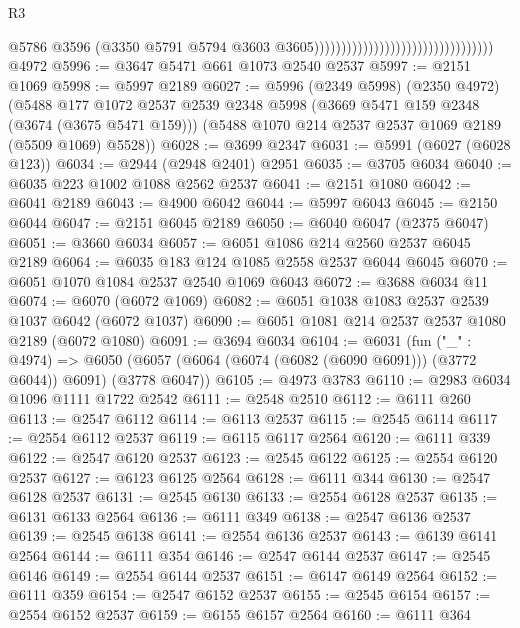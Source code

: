 \begin{lexlean}{R3}
\begin{coremodule}
                                                                    @5786
                                                                    @3596
                                                                    (@3350
                                                                      @5791
                                                                      @5794
                                                                      @3603
                                                                      @3605)))))))))))))))))))))))))))))))))
    @4972
@5996 := @3647 @5471 @661 @1073 @2540 @2537
@5997 := @2151 @1069
@5998 := @5997 @2189
@6027 := @5996
    (@2349 @5998)
    (@2350 @4972)
    (@5488
      @177
      @1072
      @2537
      @2539
      @2348
      @5998
      (@3669 @5471 @159 @2348 (@3674 (@3675 @5471 @159)))
      (@5488 @1070 @214 @2537 @2537 @1069 @2189 (@5509 @1069) @5528))
@6028 := @3699 @2347
@6031 := @5991 (@6027 (@6028 @123))
@6034 := @2944 (@2948 @2401) @2951
@6035 := @3705 @6034
@6040 := @6035 @223 @1002 @1088 @2562 @2537
@6041 := @2151 @1080
@6042 := @6041 @2189
@6043 := @4900 @6042
@6044 := @5997 @6043
@6045 := @2150 @6044
@6047 := @2151 @6045 @2189
@6050 := @6040 @6047 (@2375 @6047)
@6051 := @3660 @6034
@6057 := @6051 @1086 @214 @2560 @2537 @6045 @2189
@6064 := @6035 @183 @124 @1085 @2558 @2537 @6044 @6045
@6070 := @6051 @1070 @1084 @2537 @2540 @1069 @6043
@6072 := @3688 @6034 @11
@6074 := @6070 (@6072 @1069)
@6082 := @6051 @1038 @1083 @2537 @2539 @1037 @6042 (@6072 @1037)
@6090 := @6051 @1081 @214 @2537 @2537 @1080 @2189 (@6072 @1080)
@6091 := @3694 @6034
@6104 := @6031
    (fun ("_" : @4974) =>
    @6050 (@6057 (@6064 (@6074 (@6082 (@6090 @6091))) (@3772 @6044)) @6091) (@3778 @6047))
@6105 := @4973 @3783
@6110 := @2983 @6034 @1096 @1111 @1722 @2542
@6111 := @2548 @2510
@6112 := @6111 @260
@6113 := @2547 @6112
@6114 := @6113 @2537
@6115 := @2545 @6114
@6117 := @2554 @6112 @2537
@6119 := @6115 @6117 @2564
@6120 := @6111 @339
@6122 := @2547 @6120 @2537
@6123 := @2545 @6122
@6125 := @2554 @6120 @2537
@6127 := @6123 @6125 @2564
@6128 := @6111 @344
@6130 := @2547 @6128 @2537
@6131 := @2545 @6130
@6133 := @2554 @6128 @2537
@6135 := @6131 @6133 @2564
@6136 := @6111 @349
@6138 := @2547 @6136 @2537
@6139 := @2545 @6138
@6141 := @2554 @6136 @2537
@6143 := @6139 @6141 @2564
@6144 := @6111 @354
@6146 := @2547 @6144 @2537
@6147 := @2545 @6146
@6149 := @2554 @6144 @2537
@6151 := @6147 @6149 @2564
@6152 := @6111 @359
@6154 := @2547 @6152 @2537
@6155 := @2545 @6154
@6157 := @2554 @6152 @2537
@6159 := @6155 @6157 @2564
@6160 := @6111 @364

\end{coremodule}
\end{lexlean}
